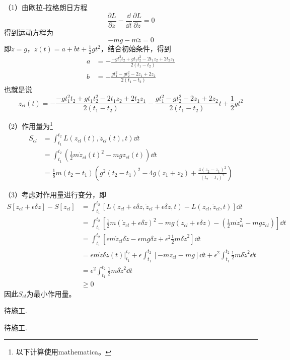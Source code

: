 \begin{solution}
	（1）由欧拉-拉格朗日方程
	\[\frac{\partial L}{\partial z}-\frac{\dd}{\dd t}\frac{\partial L}{\partial \dot{z}}=0\]
	得到运动方程为
	\[-mg-m\ddot{z}=0\]
	即\(\ddot{z}=g\)，\(z(t)=a+bt+\frac{1}{2}gt^2\)，结合初始条件，得到
	\begin{align*}
		a&=-\frac{-g t_1^2 t_2+g t_1 t_2^2-2 t_1 z_2+2 t_2 z_1}{2 (t_1-t_2)}\\
		b&=-\frac{g t_1^2-g t_2^2-2 z_1+2 z_2}{2 (t_1-t_2)}
	\end{align*}
	也就是说
	\[z_{cl}(t)=-\frac{-g t_1^2 t_2+g t_1 t_2^2-2 t_1 z_2+2 t_2 z_1}{2 (t_1-t_2)}-\frac{g t_1^2-g t_2^2-2 z_1+2 z_2}{2 (t_1-t_2)}t+\frac{1}{2}g t^2\]
	
	（2）作用量为\footnote{以下计算使用mathematica。}
	\begin{align*}
		S_{cl}&=\int_{t_1}^{t_2} L(z_{cl}(t),\dot{z}_{cl}(t),t)\dd t\\
		&=\int_{t_1}^{t_2} \left(\frac{1}{2}m\dot{z}_{cl}(t)^2-mgz_{cl}(t) \right)\dd t\\
		&=\frac{1}{8} m (t_2-t_1) \left(g^2 (t_2-t_1)^2-4 g (z_1+z_2)+\frac{4 (z_2-z_1)^2}{(t_2-t_1)^2}\right)
	\end{align*}
	
	（3）考虑对作用量进行变分，即
	\begin{align*}
		S[z_{cl}+\epsilon \delta z]-S[z_{cl}]&=\int_{t_1}^{t_2} \left[L(z_{cl}+\epsilon \delta z,\dot{z}_{cl}+\epsilon \delta \dot{z},t)-L(z_{cl},\dot{z}_{cl},t)\right]\dd t\\
		&=\int_{t_1}^{t_2}\left[\frac{1}{2}m(\dot{z}_{cl}+\epsilon \delta \dot{z})^2-mg(z_{cl}+\epsilon \delta z)-(\frac{1}{2}m\dot{z}_{cl}^2-mgz_{cl})\right]\dd t\\
		&=\int_{t_1}^{t_2}\left[\epsilon m\dot{z}_{cl}\delta \dot{z}-\epsilon mg \delta z+\epsilon^2\frac{1}{2}m \delta \dot{z}^2 \right]\dd t\\
		&=\epsilon m \dot{z}\delta z(t)\bigg|_{t_1}^{t_2}+\epsilon\int_{t_1}^{t_2} \left[-m\ddot{z}_{cl}-mg\right]\dd t+\epsilon^2\int_{t_1}^{t_2}\frac{1}{2}m \delta \dot{z}^2 \dd t\\
		&=\epsilon^2\int_{t_1}^{t_2}\frac{1}{2}m \delta \dot{z}^2 \dd t\\
		&\geq 0
	\end{align*}
	因此\(S_{cl}\)为最小作用量。
\end{solution}



\problem{}
\begin{solution}
	待施工.
\end{solution}



\problem{}
\begin{solution}
	待施工.
\end{solution}


